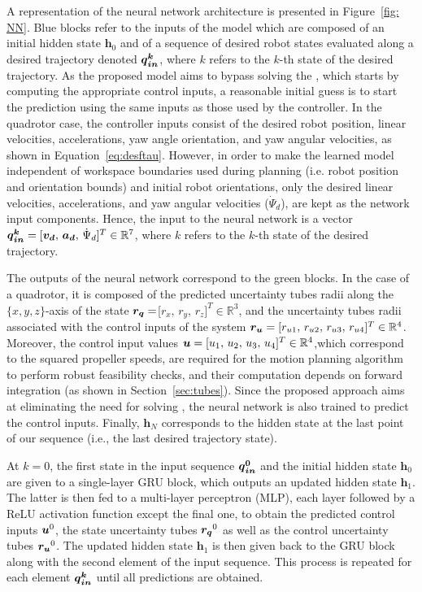 A representation of the neural network architecture is presented in Figure~\ref{fig: NN}.
Blue blocks refer to the inputs of the model which are composed of an initial hidden state $\boldsymbol{h}_{0}$ and of a sequence of desired robot states evaluated along a desired trajectory denoted $\boldsymbol{\boldsymbol{q}_{in}^k}$, where $k$ refers to the $k$-th state of the desired trajectory. 
As the proposed model aims to bypass solving the , which starts by computing the appropriate control inputs, a reasonable initial guess is to start the prediction using the same inputs as those used by the controller.
In the quadrotor case, the controller inputs consist of the desired robot position, linear velocities, accelerations, yaw angle orientation, and yaw angular velocities, as shown in Equation~\ref{eq:desftau}. 
However, in order to make the learned model independent of workspace boundaries used during planning (i.e. robot position and orientation bounds) and initial robot orientations, only the desired linear velocities, accelerations, and yaw angular velocities ($\Dot{\Psi}_d$), are kept as the network input components.
Hence, the input to the neural network is a vector $\boldsymbol{\boldsymbol{q}_{in}^k} = [\boldsymbol{v_d} ,\, \boldsymbol{a_d} ,\, \Dot{\Psi}_d]^T \in \mathbb{R}^7$, where $k$ refers to the $k$-th state of the desired trajectory.

The outputs of the neural network correspond to the green blocks.
In the case of a quadrotor, it is composed of the predicted uncertainty tubes radii along the $\{x,y,z\}$-axis of the state $\boldsymbol{r_q}=$[$r_{x},\,r_{y},\,r_{z}]^T \in \mathbb{R}^3$, and the uncertainty tubes radii associated with the control inputs of the system $\boldsymbol{r_u} = [r_{u1},\,r_{u2},\,r_{u3},\,r_{u4}]^T \in \mathbb{R}^4$.
Moreover, the control input values $\boldsymbol{u} = [u_1 ,\, u_2 ,\, u_3 ,\, u_4]^T \in \mathbb{R}^4$,which correspond to the squared propeller speeds, are required for the motion planning algorithm to perform robust feasibility checks, and their computation depends on  forward integration (as shown in Section~\ref{sec:tubes}). 
Since the proposed approach aims at eliminating the need for solving , the neural network is also trained to predict the control inputs.
Finally, $\boldsymbol{h}_{N}$ corresponds to the hidden state at the last point of our sequence (i.e., the last desired trajectory state).

At $k=0$, the first state in the input sequence $\boldsymbol{\boldsymbol{q}_{in}^0}$ and the initial hidden state $\boldsymbol{h}_0$ are given to a single-layer GRU block, which outputs an updated hidden state $\boldsymbol{h}_1$. 
The latter is then fed to a multi-layer perceptron (MLP), each layer followed by a ReLU activation function except the final one, to obtain the predicted control inputs $\boldsymbol{u}^0$, the state uncertainty tubes $\boldsymbol{r_q}^0$ as well as the control uncertainty tubes $\boldsymbol{r_u}^0$. 
The updated hidden state $\boldsymbol{h}_1$ is then given back to the GRU block along with the second element of the input sequence. 
This process is repeated for each element $\boldsymbol{\boldsymbol{q}_{in}^k}$ until all predictions are obtained.


